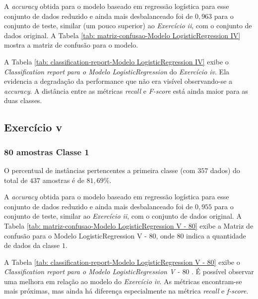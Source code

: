 A \textit{accuracy} obtida para o modelo baseado em regressão logística para esse conjunto de dados reduzido e ainda mais desbalanceado foi de $0,963$ para o conjunto de teste, similar (um pouco superior) ao \textit{Exercício ii}, com o conjunto de dados original. A Tabela \ref{tab: matriz-confusao-Modelo LogisticRegression IV} mostra a matriz de confusão para o modelo.



A Tabela \ref{tab: classification-report-Modelo LogisticRegression IV} exibe o \textit{Classification report para o Modelo LogisticRegression} do \textit{Exercício iv}. Ela evidencia a degradação da performance que não era visível observando-se a \textit{accuracy}. A distância entre as métricas \textit{recall} e \textit{F-score} está ainda maior para as duas classes.



\subsection{Exercício v}

\subsubsection{80 amostras Classe 1}

O percentual de instâncias pertencentes a primeira classe (com $357$ dados) do total de $437$ amostras é de $81,69\%$.

A \textit{accuracy} obtida para o modelo baseado em regressão logística para esse conjunto de dados reduzido e ainda mais desbalanceado foi de $0,955$ para o conjunto de teste, similar ao \textit{Exercício ii}, com o conjunto de dados original. A Tabela \ref{tab: matriz-confusao-Modelo LogisticRegression V - 80} exibe a Matriz de confusão para o Modelo LogisticRegression V - $80$, onde $80$ indica a quantidade de dados da classe $1$.



A Tabela \ref{tab: classification-report-Modelo LogisticRegression V - 80} exibe o \textit{Classification report para o Modelo LogisticRegression V - $80$ }. É possível observar uma melhora em relação ao modelo do \textit{Exercício iv}. As métricas encontram-se mais próximas, mas ainda há diferença especialmente na métrica \textit{recall} e \textit{f-score}.

